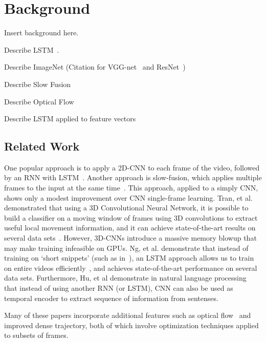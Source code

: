 \section{Background}
Insert background here.

Describe LSTM~\cite{lstm}.

Describe ImageNet (Citation for VGG-net~\cite{vggnet} and ResNet~\cite{resnet})

Describe Slow Fusion~\cite{cnnvid}

Describe Optical Flow~\cite{brox}

Describe LSTM applied to feature vectors~\cite{}

\subsection{Related Work}
One popular approach is to apply a 2D-CNN to each frame of the video, followed by an RNN with LSTM~\cite{ltrcn}. 
Another approach is slow-fusion, which applies multiple frames to the input at the same time~\cite{cnnvid}. This approach, applied to a simply CNN, shows only a modest improvement over CNN single-frame learning.
Tran, et al. demonstrated that using a 3D Convolutional Neural Network, it is possible to build a classifier on a moving window of frames using 3D convolutions to extract useful local movement information, and it can achieve state-of-the-art results on several data sets~\cite{stf}. However, 3D-CNNs introduce a massive memory blowup that may make training infeasible on GPUs.
Ng, et al. demonstrate that instead of training on `short snippets' (such as in~\cite{cnnvid,stf}), an LSTM approach allows us to train on entire videos efficiently~\cite{snip}, and achieves state-of-the-art performance on several data sets. Furthermore, Hu, et al \cite{cnnMNLS} demonstrate in natural language processing that instead of using another RNN (or LSTM), CNN can also be used as temporal encoder to extract sequence of information from sentenses. 

Many of these papers incorporate additional features such as optical flow~\cite{brox} and improved dense trajectory, both of which involve optimization techniques applied to subsets of frames. 
